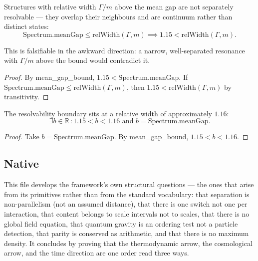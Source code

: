 \begin{theorem}
Structures with relative width $\Gamma/m$ above the mean gap are not separately resolvable — they overlap their neighbours and are continuum rather than distinct states:
\begin{equation}
\text{Spectrum.meanGap} \le \text{relWidth}(\Gamma, m) \implies 1.15 < \text{relWidth}(\Gamma, m).
\end{equation}

This is falsifiable in the awkward direction: a narrow, well-separated resonance with $\Gamma/m$ above the bound would contradict it.
\begin{proof}
By mean\_gap\_bound, $1.15 < \text{Spectrum.meanGap}$. If $\text{Spectrum.meanGap} \le \text{relWidth}(\Gamma, m)$, then $1.15 < \text{relWidth}(\Gamma, m)$ by transitivity.
\end{proof}
\end{theorem}

\begin{theorem}
The resolvability boundary sits at a relative width of approximately $1.16$:
\begin{equation}
\exists b \in \mathbb{R} \, : 1.15 < b < 1.16 \text{ and } b = \text{Spectrum.meanGap}.
\end{equation}
\begin{proof}
Take $b = \text{Spectrum.meanGap}$. By mean\_gap\_bound, $1.15 < b < 1.16$.
\end{proof}
\end{theorem}

\subsection{Native}

This file develops the framework's own structural questions — the ones that arise from its primitives rather than from the standard vocabulary: that separation is non-parallelism (not an assumed distance), that there is one switch not one per interaction, that content belongs to scale intervals not to scales, that there is no global field equation, that quantum gravity is an ordering test not a particle detection, that parity is conserved as arithmetic, and that there is no maximum density. It concludes by proving that the thermodynamic arrow, the cosmological arrow, and the time direction are one order read three ways.

